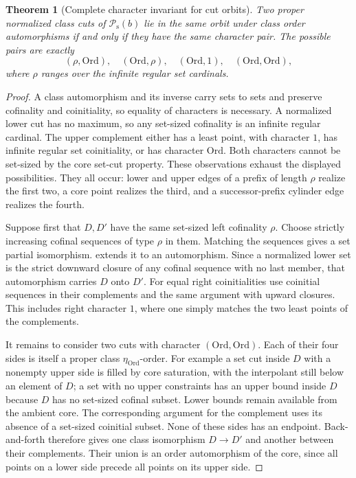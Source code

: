 \documentclass[11pt]{article}
\newtheorem{theorem}{Theorem}[section]
\theoremstyle{definition}
\theoremstyle{remark}
\newcommand{\Ord}{\mathrm{Ord}}
\newcommand{\Psupp}{\mathcal P_{\mathrm{s}}}
\begin{document}
\begin{theorem}[Complete character invariant for cut orbits]
\label{swo:tc:thm:orbits}
Two proper normalized class cuts of $\Psupp(b)$ lie in the same orbit
under class order automorphisms if and only if they have the same
character pair. The possible pairs are exactly
\[
 (\rho,\Ord),\quad (\Ord,\rho),\quad
 (\Ord,1),\quad (\Ord,\Ord),
\]
where $\rho$ ranges over the infinite regular set cardinals.
\end{theorem}
\begin{proof}
A class automorphism and its inverse carry sets to sets and preserve
cofinality and coinitiality, so equality of characters is necessary.
A normalized lower cut has no maximum, so any set-sized cofinality is
an infinite regular cardinal. The upper complement either has a least
point, with character $1$, has infinite regular set coinitiality, or
has character $\Ord$. Both characters cannot be set-sized by the core
set-cut property. These observations exhaust the displayed possibilities.
They all occur: lower and upper edges of a prefix of length $\rho$
realize the first two, a core point realizes the third, and a
successor-prefix cylinder edge realizes the fourth.

Suppose first that $D,D'$ have the same set-sized left cofinality
$\rho$. Choose strictly increasing cofinal sequences of type $\rho$
in them. Matching the sequences gives a set partial isomorphism.
 extends it to an automorphism. Since a
normalized lower set is the strict downward closure of any cofinal
sequence with no last member, that automorphism carries $D$ onto $D'$.
For equal right coinitialities use coinitial sequences in their
complements and the same argument with upward closures. This includes
right character $1$, where one simply matches the two least points
of the complements.

It remains to consider two cuts with character $(\Ord,\Ord)$.
Each of their four sides is itself a proper class
$\eta_{\Ord}$-order. For example a set cut inside $D$ with a nonempty
upper side is filled by core saturation, with the interpolant still
below an element of $D$; a set with no upper constraints has an upper
bound inside $D$ because $D$ has no set-sized cofinal subset. Lower
bounds remain available from the ambient core. The corresponding
argument for the complement uses its absence of a set-sized coinitial
subset. None of these sides has an endpoint. Back-and-forth therefore
gives one class isomorphism $D\to D'$ and another between their
complements. Their union is an order automorphism of the core, since
all points on a lower side precede all points on its upper side.
\end{proof}
\end{document}
